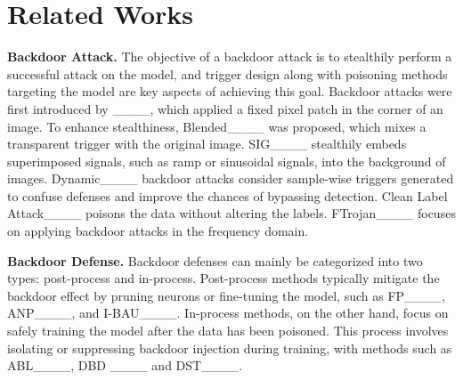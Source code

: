 \section{Related Works}
\textbf{Backdoor Attack.} The objective of a backdoor attack is to stealthily perform a successful attack on the model, and trigger design along with poisoning methods targeting the model are key aspects of achieving this goal.  Backdoor attacks were first introduced by ____, which applied a fixed pixel patch in the corner of an image. To enhance stealthiness, Blended____ was proposed, which mixes a transparent trigger with the original image. SIG____ stealthily embeds superimposed signals, such as ramp or sinusoidal signals, into the background of images. Dynamic____ backdoor attacks consider sample-wise triggers generated to confuse defenses and improve the chances of bypassing detection. Clean Label Attack____ poisons the data without altering the labels. FTrojan____ focuses on applying backdoor attacks in the frequency domain. 

\noindent\textbf{Backdoor Defense.} Backdoor defenses can mainly be categorized into two types: post-process and in-process. Post-process methods typically mitigate the backdoor effect by pruning neurons or fine-tuning the model, such as FP____, ANP____, and I-BAU____. In-process methods, on the other hand, focus on safely training the model after the data has been poisoned. This process involves isolating or suppressing backdoor injection during training, with methods such as ABL____, DBD ____ and DST____.
